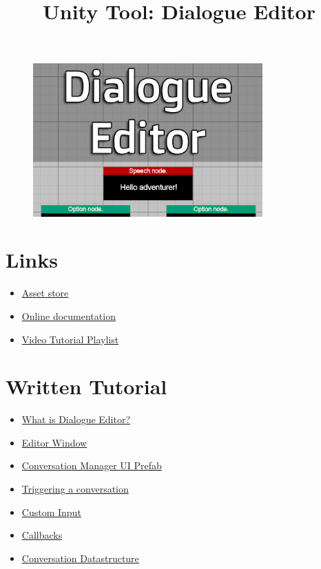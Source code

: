 \documentclass[a4paper,12pt]{article}
\begin{document}
\title{Unity Tool: Dialogue Editor\vspace{-50pt}}
\date{}
\maketitle

\begin{figure}[ht]
\centering
\includegraphics[width=250pt, keepaspectratio]{img/CardImage.png}
\end{figure}




\section{Links}
\begin{itemize}
\setlength\itemsep{1pt}
	\item \href{https://assetstore.unity.com/packages/tools/utilities/dialogue-editor-168329}{Asset store}
	\item \href{https://josephbarber96.github.io/dialogueeditor.html}{Online documentation}
	\item \href{https://www.youtube.com/playlist?list=PLfRF6lnXtGqjrhzyQhidqMD-shMHGReXi}{Video Tutorial Playlist}
\end{itemize}




\section{Written Tutorial}
\begin{itemize}
\setlength\itemsep{1pt}
	\item \hyperlink{_whatis}{What is Dialogue Editor?}
	\item \hyperlink{_editorwindow}{Editor Window}
	\item \hyperlink{_conversationmanager}{Conversation Manager UI Prefab}
	\item \hyperlink{_triggering}{Triggering a conversation}
	\item \hyperlink{_custominput}{Custom Input}
	\item \hyperlink{_callbacks}{Callbacks}
	\item \hyperlink{_datastructure}{Conversation Datastructure}
\end{itemize}
\end{document}
